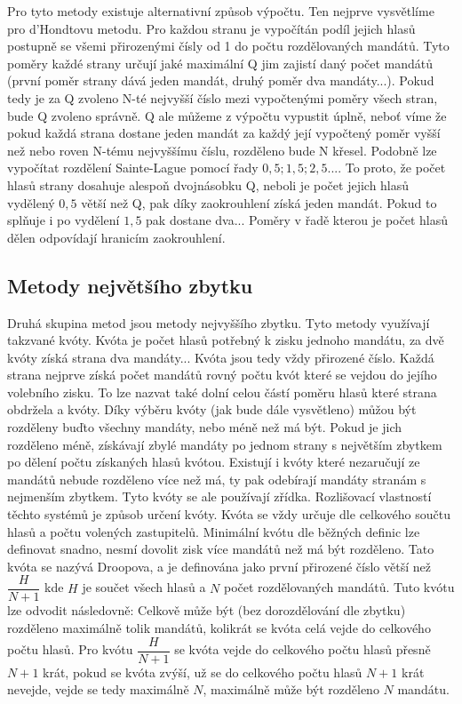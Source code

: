 \documentclass[12pt]{report}
\begin{document}
Pro tyto metody existuje alternativní způsob výpočtu.
Ten nejprve vysvětlíme pro d'Hondtovu metodu.
Pro každou stranu je vypočítán podíl jejich hlasů postupně se všemi přirozenými čísly od 1 do počtu rozdělovaných mandátů.
Tyto poměry každé strany určují jaké maximální Q jim zajistí daný počet mandátů (první poměr strany dává jeden mandát, druhý poměr dva mandáty...).
Pokud tedy je za Q zvoleno N-té nejvyšší číslo mezi vypočtenými poměry všech stran, bude Q zvoleno správně.
Q ale můžeme z výpočtu vypustit úplně, neboť víme že pokud každá strana dostane jeden mandát za každý její vypočtený poměr vyšší než nebo roven N-tému nejvyššímu číslu, rozděleno bude N křesel.
Podobně lze vypočítat rozdělení Sainte-Lague pomocí řady $0{,}5; 1{,}5; 2{,}5...$.
To proto, že počet hlasů strany dosahuje alespoň dvojnásobku Q, neboli je počet jejich hlasů vydělený $0{,}5$ větší než Q, pak díky zaokrouhlení získá jeden mandát.
Pokud to splňuje i po vydělení $1{,}5$ pak dostane dva...
Poměry v řadě kterou je počet hlasů dělen odpovídají hranicím zaokrouhlení.
\subsection{Metody největšího zbytku} 
Druhá skupina metod jsou metody nejvyššího zbytku.
Tyto metody využívají takzvané kvóty.
Kvóta je počet hlasů potřebný k zisku jednoho mandátu, za dvě kvóty získá strana dva mandáty...
Kvóta jsou tedy vždy přirozené číslo.
Každá strana nejprve získá počet mandátů rovný počtu kvót které se vejdou do jejího volebního zisku.
To lze nazvat také dolní celou částí poměru hlasů které strana obdržela a kvóty.
Díky výběru kvóty (jak bude dále vysvětleno) můžou být rozděleny buďto všechny mandáty, nebo méně než má být.
Pokud je jich rozděleno méně, získávají zbylé mandáty po jednom strany s největším zbytkem po dělení počtu získaných hlasů kvótou.
Existují i kvóty které nezaručují ze mandátů nebude rozděleno více než má, ty pak odebírají mandáty stranám s nejmenším zbytkem.
Tyto kvóty se ale používají zřídka.
Rozlišovací vlastností těchto systémů je způsob určení kvóty.
Kvóta se vždy určuje dle celkového součtu hlasů a počtu volených zastupitelů.
Minimální kvótu dle běžných definic lze definovat snadno, nesmí dovolit zisk více mandátů než má být rozděleno.
Tato kvóta se nazývá Droopova, a je definována jako první přirozené číslo větší než $\dfrac{H}{N+1}$ kde $H$ je součet všech hlasů a $N$ počet rozdělovaných mandátů.
Tuto kvótu lze odvodit následovně: Celkově může být (bez dorozdělování dle zbytku) rozděleno maximálně tolik mandátů, kolikrát se kvóta celá vejde do celkového počtu hlasů.
Pro kvótu $\dfrac{H}{N+1}$ se kvóta vejde do celkového počtu hlasů přesně $N+1$ krát, pokud se kvóta zvýší, už se do celkového počtu hlasů $N+1$ krát nevejde, vejde se tedy maximálně $N$, maximálně může být rozděleno $N$ mandátu.
\end{document}
